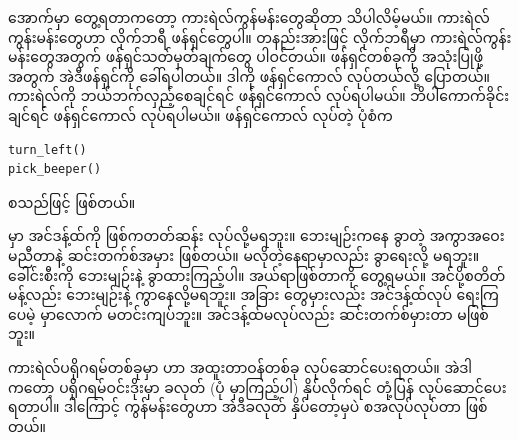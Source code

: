  အောက်မှာ တွေ့ရတာကတော့ ကားရဲလ်ကွန်မန်းတွေဆိုတာ သိပါလိမ့်မယ်။ ကားရဲလ်ကွန်းမန်းတွေဟာ  လိုက်ဘရီ ဖန်ရှင်တွေပါ။ တနည်းအားဖြင့်  လိုက်ဘရီမှာ ကားရဲလ်ကွန်းမန်းတွေအတွက် ဖန်ရှင်သတ်မှတ်ချက်တွေ ပါဝင်တယ်။ ဖန်ရှင်တစ်ခုကို အသုံးပြုဖို့အတွက် အဲဒီဖန်ရှင်ကို ခေါ်ရပါတယ်။ ဒါကို   ဖန်ရှင်ကောလ်  လုပ်တယ်လို့ ပြောတယ်။ ကားရဲလ်ကို ဘယ်ဘက်လှည့်စေချင်ရင်  ဖန်ရှင်ကောလ် လုပ်ရပါမယ်။ ဘိပါကောက်ခိုင်းချင်ရင်  ဖန်ရှင်ကောလ် လုပ်ရပါမယ်။ ဖန်ရှင်ကောလ် လုပ်တဲ့ ပုံစံက
%
\setlength{\fboxsep}{0pt}
\begin{verbatim}
turn_left()
pick_beeper()
\end{verbatim}
စသည်ဖြင့် ဖြစ်တယ်။

\begin{mytcbox}
 မှာ အင်ဒန့်ထ်ကို ဖြစ်ကတတ်ဆန်း လုပ်လို့မရဘူး။ ဘေးမျဉ်းကနေ ခွာတဲ့ အကွာအဝေး မညီတာနဲ့ ဆင်းတက်စ်အမှား ဖြစ်တယ်။ မလိုတဲ့နေရာမှာလည်း ခွာရေးလို့ မရဘူး။ ခေါင်းစီးကို ဘေးမျဉ်းနဲ့ ခွာထားကြည့်ပါ။ အယ်ရာဖြစ်တာကို တွေ့ရမယ်။ အင်ပို့စတိတ်မန့်လည်း ဘေးမျဉ်းနဲ့ ကွာနေလို့မရဘူး။ အခြား  တွေမှားလည်း အင်ဒန့်ထ်လုပ် ရေးကြပေမဲ့  မှာလောက် မတင်းကျပ်ဘူး။ အင်ဒန့်ထ်မလုပ်လည်း ဆင်းတက်စ်မှားတာ မဖြစ်ဘူး။
\end{mytcbox}

ကားရဲလ်ပရိုဂရမ်တစ်ခုမှာ  ဟာ  အထူးတာဝန်တစ်ခု လုပ်ဆောင်ပေးရတယ်။ အဲဒါကတော့ ပရိုဂရမ်ဝင်းဒိုးမှာ   ခလုတ် (ပုံ \fRefNo{\ref{fig:mtkrlprgm1}} မှာကြည့်ပါ) နှိပ်လိုက်ရင် တုံ့ပြန် လုပ်ဆောင်ပေးရတာပါ။ ဒါကြောင့် ကွန်မန်းတွေဟာ အဲဒီခလုတ် နှိပ်တော့မှပဲ စအလုပ်လုပ်တာ ဖြစ်တယ်။

